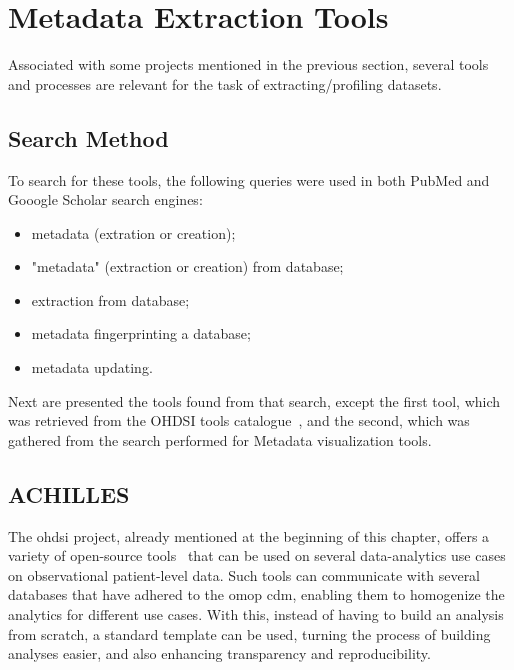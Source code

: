 \section{Metadata Extraction Tools}

Associated with some projects mentioned in the previous section, several tools and
processes are relevant for the task of extracting/profiling datasets.

\subsection*{Search Method}

To search for these tools, the following queries were used in both PubMed and Gooogle Scholar search engines:
\begin{itemize}
    \item metadata (extration or creation);
    \item "metadata" (extraction or creation) from database;
    \item extraction from database;
    \item metadata fingerprinting a database;
    \item metadata updating.
\end{itemize}

Next are presented the tools found from that search, except the first tool, which was retrieved from the OHDSI tools catalogue~\cite{ohdsi-tools}, and the second, which was gathered from the search performed for Metadata visualization tools.

\subsection*{ACHILLES}
The \gls{ohdsi} project, already mentioned at the beginning of this chapter, offers a variety of open-source tools~\cite{ohdsi-tools} that can be used on several data-analytics use cases on observational patient-level data.
Such tools can communicate with several databases that have adhered to the \gls{omop} \gls{cdm}, enabling them to homogenize the analytics for different use cases.
With this, instead of having to build an analysis from scratch, a standard template can be used, turning the process of building analyses easier, and also enhancing transparency and reproducibility.


